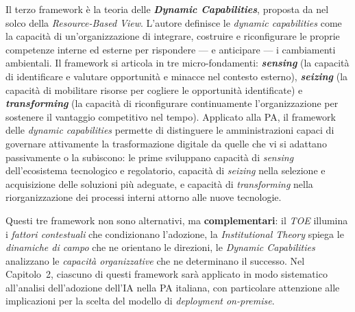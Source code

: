 Il terzo framework è la teoria delle \textbf{\textit{Dynamic Capabilities}}, proposta da \textcite{Teece2007} nel solco della \textit{Resource-Based View}. L'autore definisce le \textit{dynamic capabilities} come la capacità di un'organizzazione di integrare, costruire e riconfigurare le proprie competenze interne ed esterne per rispondere — e anticipare — i cambiamenti ambientali. Il framework si articola in tre micro-fondamenti: \textbf{\textit{sensing}} (la capacità di identificare e valutare opportunità e minacce nel contesto esterno), \textbf{\textit{seizing}} (la capacità di mobilitare risorse per cogliere le opportunità identificate) e \textbf{\textit{transforming}} (la capacità di riconfigurare continuamente l'organizzazione per sostenere il vantaggio competitivo nel tempo). Applicato alla PA, il framework delle \textit{dynamic capabilities} permette di distinguere le amministrazioni capaci di governare attivamente la trasformazione digitale da quelle che vi si adattano passivamente o la subiscono: le prime sviluppano capacità di \textit{sensing} dell'ecosistema tecnologico e regolatorio, capacità di \textit{seizing} nella selezione e acquisizione delle soluzioni più adeguate, e capacità di \textit{transforming} nella riorganizzazione dei processi interni attorno alle nuove tecnologie.

Questi tre framework non sono alternativi, ma \textbf{complementari}: il \textit{TOE} illumina i \textit{fattori contestuali} che condizionano l'adozione, la \textit{Institutional Theory} spiega le \textit{dinamiche di campo} che ne orientano le direzioni, le \textit{Dynamic Capabilities} analizzano le \textit{capacità organizzative} che ne determinano il successo. Nel Capitolo~2, ciascuno di questi framework sarà applicato in modo sistematico all'analisi dell'adozione dell'IA nella PA italiana, con particolare attenzione alle implicazioni per la scelta del modello di \textit{deployment on-premise}.



